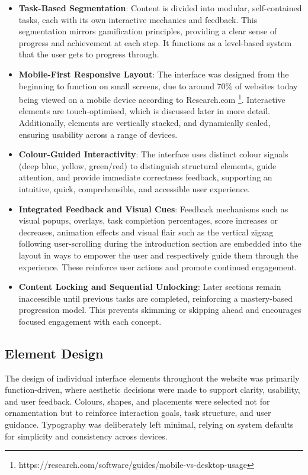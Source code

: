 \begin{itemize}
    \item \textbf{Task-Based Segmentation}: Content is divided into modular, self-contained tasks, each with its own interactive mechanics and feedback. 
    This segmentation mirrors gamification principles, providing a clear sense of progress and achievement at each step. 
    It functions as a level-based system that the user gets to progress through.
    \item \textbf{Mobile-First Responsive Layout}: The interface was designed from the beginning to function on small screens, due to around 70\% of websites today being viewed on a mobile device according to Research.com \footnote{https://research.com/software/guides/mobile-vs-desktop-usage}. 
    Interactive elements are touch-optimised, which is discussed later in more detail. 
    Additionally, elements are vertically stacked, and dynamically scaled, ensuring usability across a range of devices.
    \item \textbf{Colour-Guided Interactivity}:  The interface uses distinct colour signals (deep blue, yellow, green/red) to distinguish structural elements, guide attention, and provide immediate correctness feedback, supporting an intuitive, quick, comprehensible, and accessible user experience.
    \item \textbf{Integrated Feedback and Visual Cues}:  Feedback mechanisms such as visual popups, overlays, task completion percentages, score increases or decreases, animation effects and visual flair such as the vertical zigzag following user-scrolling during the introduction section are embedded into the layout in ways to empower the user and respectively guide them through the experience. 
    These reinforce user actions and promote continued engagement.
    \item \textbf{Content Locking and Sequential Unlocking}:  Later sections remain inaccessible until previous tasks are completed, reinforcing a mastery-based progression model. 
    This prevents skimming or skipping ahead and encourages focused engagement with each concept.
\end{itemize}

\subsection{Element Design}
The design of individual interface elements throughout the website was primarily function-driven, where aesthetic decisions were made to support clarity, usability, and user feedback. 
Colours, shapes, and placements were selected not for ornamentation but to reinforce interaction goals, task structure, and user guidance. 
Typography was deliberately left minimal, relying on system defaults for simplicity and consistency across devices.

